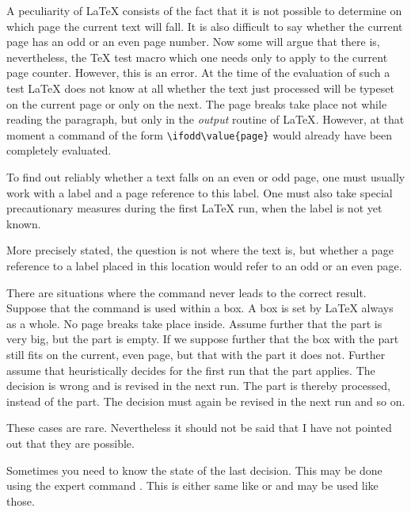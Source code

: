 \begin{Declaration}
    
\end{Declaration}%
%
%
\begin{Explain}%
  A peculiarity of {\LaTeX} consists of the fact that it is not
  possible to determine on which page the current text will fall. It
  is also difficult to say whether the current page has an odd or an
  even page number. Now some will argue that there is, nevertheless,
  the {\TeX} test macro  which one needs only to apply to
  the current page counter. However, this is an error. At the time of
  the evaluation of such a test {\LaTeX} does not know at all whether
  the text just processed will be typeset on the current page or only
  on the next. The page breaks take place not while reading the
  paragraph, but only in the \emph{output} routine of
  {\LaTeX}. However, at that moment a command of the form
  \verb|\ifodd\value{page}| would already have been completely
  evaluated.

  To find out reliably whether a text falls on an even or odd
  page, one must usually work with a label and a page reference to
  this label. One must also take special precautionary measures during
  the first {\LaTeX} run, when the label is not yet known.

  More precisely stated, the question is not where the text is, but
  whether a page reference to a label placed in this location would
  refer to an odd or an even page.

  There are situations where the  command never
  leads to the correct result. Suppose that the command is used within
  a box. A box is set by {\LaTeX} always as a whole. No page breaks
  take place inside. Assume further that the  part is very
  big, but the  part is empty. If we suppose further that
  the box with the  part still fits on the current, even
  page, but that with the  part it does not.  Further
  assume that {\KOMAScript} heuristically decides for the first run
  that the  part applies. The decision is wrong and is
  revised in the next run. The  part is thereby
  processed, instead of the  part. The decision must again
  be revised in the next run and so on.

  These cases are rare. Nevertheless it should not be said that I have
  not pointed out that they are possible.

  Sometimes you need to know the state of the last decision. This may be done
  using the expert command . This is either same like
   or  and may be used like those.
\end{Explain}
%
%
%

